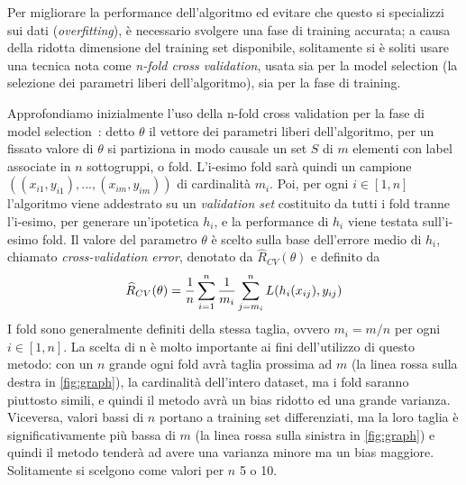 \documentclass{article}
\begin{document}
	Per migliorare la performance dell'algoritmo ed evitare che questo si specializzi sui dati (\textit{overfitting}), è necessario svolgere una fase di training accurata; a causa della ridotta dimensione del training set disponibile, solitamente si è soliti usare una tecnica nota come \textit{n-fold cross validation}, usata sia per la model selection (la selezione dei parametri liberi dell'algoritmo), sia per la fase di training.
	
	Approfondiamo inizialmente l'uso della n-fold cross validation per la fase di model selection~\cite{bib:cv}: detto $\theta$ il vettore dei parametri liberi dell'algoritmo, per un fissato valore di $\theta$ si partiziona in modo causale un set $S$ di $m$ elementi con label associate in $n$ sottogruppi, o fold. L'i-esimo fold sarà quindi un campione $((x_{i1}, y_{i1}),...,(x_{im},y_{im}))$ di cardinalità $m_i$. Poi, per ogni $i\in[1,n]$ l'algoritmo viene addestrato su un \textit{validation set} costituito da tutti i fold tranne l'i-esimo, per generare un'ipotetica $h_i$, e la performance di $h_i$ viene testata sull'i-esimo fold. Il valore del parametro $\theta$ è scelto sulla base dell'errore medio di $h_i$, chiamato \textit{cross-validation error}, denotato da $\widehat{R}_{CV}(\theta)$ e definito da
	\[
	\widehat{R}_{CV}(\theta)={1\over n}\sum_{i=1}^n {1\over m_i}\sum_{j=m_i}^n L(h_i(x_{ij}),y_{ij})
	\]
	I fold sono generalmente definiti della stessa taglia, ovvero $m_i=m/n$ per ogni $i\in[1,n]$. La scelta di n è molto importante ai fini dell'utilizzo di questo metodo: con un $n$ grande ogni fold avrà taglia prossima ad $m$ (la linea rossa sulla destra in \ref{fig:graph}), la cardinalità dell'intero dataset, ma i fold saranno piuttosto simili, e quindi il metodo avrà un bias ridotto ed una grande varianza. Viceversa, valori bassi di $n$ portano a training set differenziati, ma la loro taglia è significativamente più bassa di $m$ (la linea rossa sulla sinistra in \ref{fig:graph}) e quindi il metodo tenderà ad avere una varianza minore ma un bias maggiore. Solitamente si scelgono come valori per $n$ 5 o 10. \\
\end{document}
